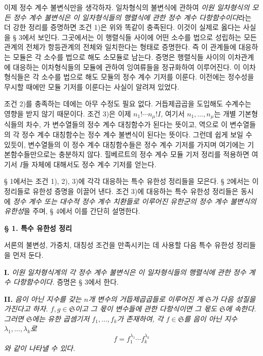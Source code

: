 이제 정수 계수 불변식만을 생각하자. 일차형식의 불변식에 관하여 \emph{이원 일차형식의 모든 정수 계수 불변식은 이 일차형식들의 행렬식에 관한 정수 계수 다항함수이다}라는 더 강한 정리를 증명하면 조건 1)은 위와 똑같이 충족된다. 이것이 실제로 옳다는 사실을 § 3에서 보인다. 그곳에서는 이 행렬식들 사이에 어떤 소수를 법으로 성립하는 모든 관계의 전체가 항등관계의 전체와 일치한다는 형태로 증명한다. 즉 이 관계들에 대응하는 모듈은 각 소수를 법으로 해도 소모듈로 남는다. 증명은 행렬식들 사이의 이차관계에 대응하는 이차형식들의 모듈에 관하여 잉여류들을 정규화하여 이루어진다. 이 이차형식들은 각 소수를 법으로 해도 모듈의 정수 계수 기저를 이룬다. 이전에는 정수성을 무시할 때에만 모듈 기저를 이룬다는 사실이 알려져 있었다.

조건 2)를 충족하는 데에는 아무 수정도 필요 없다. 거듭제곱곱을 도입해도 수계수는 영향을 받지 않기 때문이다. 조건 3)은 이제 \(n_1!\cdots n_\mu!I\), 여기서 \(n_1,\ldots,n_\mu\)는 개별 기본형식들의 차수, 가 변수열들의 정수 계수 대칭함수가 된다는 뜻이고, 역으로 이 변수열들의 각 정수 계수 대칭함수는 정수 계수 불변식이 된다는 뜻이다. 그런데 쉽게 보일 수 있듯이, 변수열들의 이 정수 계수 대칭함수들은 정수 계수 기저를 가지며 여기에는 기본함수들만으로는 충분하지 않다. 힐베르트의 정수 계수 모듈 기저 정리를 적용하면 여기서 \(I\)들 자체에 대해서도 정수 계수 기저를 얻는다.

§ 1에서는 조건 1), 2), 3)에 각각 대응하는 특수 유한성 정리들을 모은다. § 2에서는 이 정리들로 유한성 증명을 이끌어 낸다. 조건 3)에 대응하는 특수 유한성 정리들은 동시에 \emph{정수 계수 또는 대수적 정수 계수 치환들로 이루어진 유한군의 정수 계수 불변식의 유한성}을 주며, § 4에서 이를 간단히 설명한다.

\begin{center}
\textbf{§ 1. 특수 유한성 정리}
\end{center}

서론의 불변성, 가중치, 대칭성 조건을 만족시키는 데 사용할 다음 특수 유한성 정리들을 먼저 둔다.

\textbf{I.} \emph{이원 일차형식계의 각 정수 계수 불변식은 이 일차형식들의 행렬식에 관한 정수 계수 다항함수이다.} 증명은 § 3에서 한다.

\textbf{II.} \emph{음이 아닌 지수를 갖는 \(n\)개 변수의 거듭제곱곱들로 이루어진 계 \(\mathfrak S\)가 다음 성질을 가진다고 하자. \(f,g\in\mathfrak S\)이고 그 몫이 변수들에 관한 다항식이면 그 몫도 \(\mathfrak S\)에 속한다. 그러면 \(\mathfrak S\)에는 유한 곱셈기저 \(f_1,\ldots,f_k\)가 존재하여, 각 \(f\in\mathfrak S\)를 음이 아닌 지수 \(\lambda_1,\ldots,\lambda_k\)로}
\[
f=f_1^{\lambda_1}\cdots f_k^{\lambda_k}
\]
\emph{와 같이 나타낼 수 있다.}

